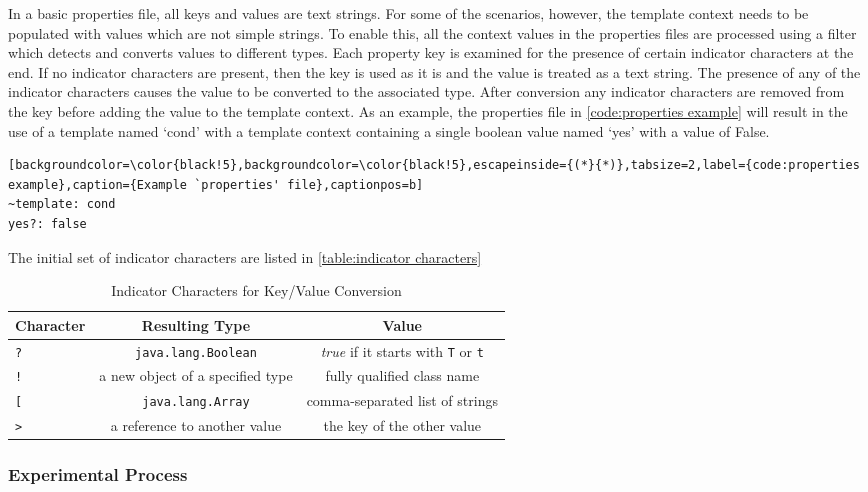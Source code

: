 In a basic properties file, all keys and values are text strings. For some of the scenarios, however, the template context needs to be populated with values which are not simple strings. To enable this, all the context values in the properties files are processed using a filter which detects and converts values to different types. Each property key is examined for the presence of certain indicator characters at the end. If no indicator characters are present, then the key is used as it is and the value is treated as a text string. The presence of any of the indicator characters causes the value to be converted to the associated type. After conversion any indicator characters are removed from the key before adding the value to the template context. As an example, the properties file in \autoref{code:properties example} will result in the use of a template named `cond' with a template context containing a single boolean value named `yes' with a value of False.

\begin{lstlisting}[backgroundcolor=\color{black!5},backgroundcolor=\color{black!5},escapeinside={(*}{*)},tabsize=2,label={code:properties example},caption={Example `properties' file},captionpos=b]
~template: cond
yes?: false
\end{lstlisting}

The initial set of indicator characters are listed in \autoref{table:indicator characters}

\begin{table}[ht!]
\centering
\begin{tabular}{lcc}
\textbf{Character} & \textbf{Resulting Type}  & \textbf{Value} \\
\hline
\verb!?!   & \verb!java.lang.Boolean! & \emph{true} if it starts with \verb!T! or \verb!t! \\
\verb|!|   & a new object of a specified type & fully qualified class name \\
\verb![!   & \verb!java.lang.Array! & comma-separated list of strings \\
\verb!>!   & a reference to another value & the key of the other value \\
\end{tabular}
\caption{Indicator Characters for Key/Value Conversion\label{table:indicator characters}}
\end{table}

\subsubsection{Experimental Process}
\label{comp:experimental process}

